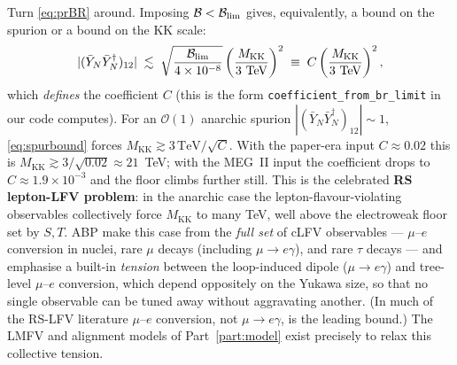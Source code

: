 \documentclass[11pt]{article}
\newcommand{\MKK}{M_{\mathrm{KK}}}
\newcommand{\YNb}{\bar Y_N}
\newcommand{\spur}{(\YNb\YNb^\dagger)_{12}}
\newcommand{\BR}{\mathcal{B}}
\newcommand{\code}[1]{\texttt{#1}}
\theoremstyle{definition}
\begin{document}
Turn \eqref{eq:prBR} around. Imposing $\BR<\BR_{\rm lim}$ gives, equivalently, a
bound on the spurion or a bound on the KK scale:
\begin{equation}
|\spur| \;\lesssim\; \sqrt{\frac{\BR_{\rm lim}}{4\times10^{-8}}}
   \left(\frac{\MKK}{3\ \mathrm{TeV}}\right)^{2}
   \;\equiv\; C\left(\frac{\MKK}{3\ \mathrm{TeV}}\right)^{2},
\label{eq:spurbound}
\end{equation}
which \emph{defines} the coefficient $C$ (this is the form
\code{coefficient\_from\_br\_limit} in our code computes). For an
$\mathcal{O}(1)$ anarchic spurion $|\spur|\sim 1$, \eqref{eq:spurbound} forces
$\MKK \gtrsim 3\,\mathrm{TeV}/\sqrt{C}$. With the paper-era input
$C\approx 0.02$ this is $\MKK\gtrsim 3/\sqrt{0.02}\approx 21$~TeV; with the
MEG~II input the coefficient drops to $C\approx 1.9\times10^{-3}$ and the floor
climbs further still. This is the celebrated \textbf{RS lepton-LFV problem}: in
the anarchic case the lepton-flavour-violating observables collectively force
$\MKK$ to many TeV, well above the electroweak floor set by $S,T$. ABP make this
case from the \emph{full set} of cLFV observables --- $\mu$--$e$ conversion in
nuclei, rare $\mu$ decays (including $\mu\to e\gamma$), and rare $\tau$ decays ---
and emphasise a built-in \emph{tension} between the loop-induced dipole
($\mu\to e\gamma$) and tree-level $\mu$--$e$ conversion, which depend oppositely on
the Yukawa size, so that no single observable can be tuned away without aggravating
another. (In much of the RS-LFV literature $\mu$--$e$ conversion, not
$\mu\to e\gamma$, is the leading bound.) The LMFV and alignment models of
Part~\ref{part:model} exist precisely to relax this collective tension.
\end{document}
